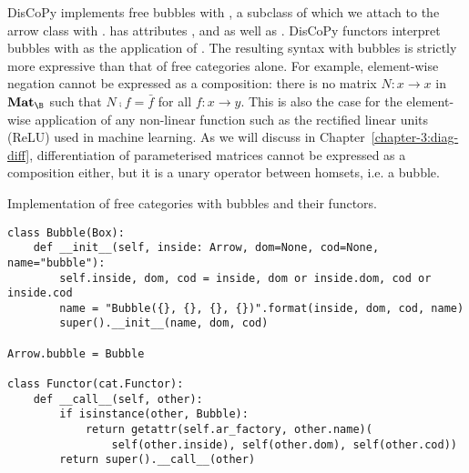 DisCoPy implements free bubbles with , a subclass of  which we attach to the arrow class with .
 has attributes ,  and  as well as .
DisCoPy functors interpret bubbles with  as the application of .
The resulting syntax with bubbles is strictly more expressive than that of free categories alone.
For example, element-wise negation cannot be expressed as a composition: there is no matrix $N : x \to x$ in $\mathbf{Mat}_\B$ such that $N \fcmp f = \bar{f}$ for all $f : x \to y$.
This is also the case for the element-wise application of any non-linear function such as the rectified linear units (ReLU) used in machine learning.
As we will discuss in Chapter~\ref{chapter-3:diag-diff}, differentiation of parameterised matrices cannot be expressed as a composition either, but it is a unary operator between homsets, i.e. a bubble.

\begin{python}
{\normalfont Implementation of free categories with bubbles and their functors.}

\begin{verbatim}
class Bubble(Box):
    def __init__(self, inside: Arrow, dom=None, cod=None, name="bubble"):
        self.inside, dom, cod = inside, dom or inside.dom, cod or inside.cod
        name = "Bubble({}, {}, {}, {})".format(inside, dom, cod, name)
        super().__init__(name, dom, cod)

Arrow.bubble = Bubble

class Functor(cat.Functor):
    def __call__(self, other):
        if isinstance(other, Bubble):
            return getattr(self.ar_factory, other.name)(
                self(other.inside), self(other.dom), self(other.cod))
        return super().__call__(other)
\end{verbatim}
\end{python}

